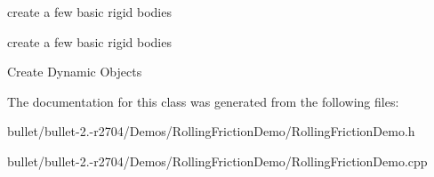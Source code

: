 create a few basic rigid bodies

create a few basic rigid bodies

Create Dynamic Objects 

The documentation for this class was generated from the following files\+:\begin{DoxyCompactItemize}
\item 
bullet/bullet-\/2.-\/r2704/\+Demos/\+Rolling\+Friction\+Demo/Rolling\+Friction\+Demo.\+h\item 
bullet/bullet-\/2.-\/r2704/\+Demos/\+Rolling\+Friction\+Demo/Rolling\+Friction\+Demo.\+cpp\end{DoxyCompactItemize}
